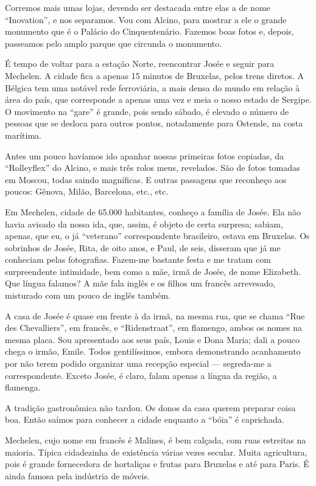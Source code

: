 Corremos mais umas lojas, devendo ser destacada entre elas a de nome ``Inovation'', e nos separamos. Vou com Alcino, para mostrar a ele o grande monumento que é o Palácio do Cinquentenário. Fazemos boas fotos e, depois, passeamos pelo amplo parque que circunda o monumento.

É tempo de voltar para a estação Norte, reencontrar Josée e seguir para Mechelen. A cidade fica a apenas 15 minutos de Bruxelas, pelos trens diretos. A Bélgica tem uma notável rede ferroviária, a mais densa do mundo em relação à área do país, que corresponde a apenas uma vez e meia o nosso estado de Sergipe. O movimento na ``gare'' é grande, pois sendo sábado, é elevado o número de pessoas que se desloca para outros pontos, notadamente para Ostende, na costa marítima.

Antes um pouco havíamos ido apanhar nossas primeiras fotos copiadas, da ``Rolleyflex'' do Alcino, e mais três rolos meus, revelados. São de fotos tomadas em Moscou, todas saindo magníficas. E outras passagens que reconheço aos poucos: Gênova, Milão, Barcelona, etc., etc.

Em Mechelen, cidade de 65.000 habitantes, conheço a família de Josée. Ela não havia avisado da nossa ida, que, assim, é objeto de certa surpresa; sabiam, apenas, que eu, o já ``veterano'' correspondente brasileiro, estava em Bruxelas. Os sobrinhos de Josée, Rita, de oito anos, e Paul, de seis, disseram que já me conheciam pelas fotografias. Fazem-me bastante festa e me tratam com surpreendente intimidade, bem como a mãe, irmã de Josée, de nome Elizabeth. Que língua falamos? A mãe fala inglês e os filhos um francês arrevesado, misturado com um pouco de inglês também.

A casa de Josée é quase em frente à da irmã, na mesma rua, que se chama ``Rue des Chevalliers'', em francês, e ``Ridenstraat'', em flamengo, ambos os nomes na mesma placa. Sou apresentado aos seus país, Louis e Dona Maria; dali a pouco chega o irmão, Emile. Todos gentilíssimos, embora demonstrando acanhamento por não terem podido organizar uma recepção especial --- segreda-me a correspondente. Exceto Josée, é claro, falam apenas a língua da região, a flamenga.

A tradição gastronômica não tardou. Os donos da casa querem preparar coisa boa. Então saímos para conhecer a cidade enquanto a ``bóia'' é caprichada.

Mechelen, cujo nome em francês é Malines, é bem calçada, com ruas estreitas na maioria. Típica cidadezinha de existência várias vezes secular. Muita agricultura, pois é grande fornecedora de hortaliças e frutas para Bruxelas e até para Paris. É ainda famosa pela indústria de móveis.

